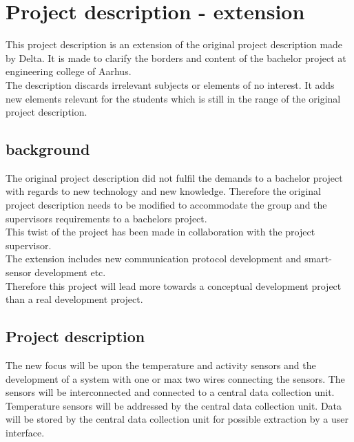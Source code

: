 \chapter{Project description - extension}
This project description is an extension of the original project description made by Delta. It is made to clarify the borders and content of the bachelor project at engineering college of Aarhus.\\
The description discards irrelevant subjects or elements of no interest. It adds new elements relevant for the students which is still in the range of the original project description.


\section{background}
The original project description did not fulfil the demands to a bachelor project with regards to new technology and new knowledge. Therefore the original project description needs to be modified to accommodate the group and the supervisors requirements to a bachelors project. \\
This twist of the project has been made in collaboration with the project supervisor.\\
The extension includes new communication protocol development and smart-sensor development etc.\\
Therefore this project will lead more towards a conceptual development project than a real development project.\\


\section{Project description}
The new focus will be upon the temperature and activity sensors and the development of a system with one or max two wires connecting the sensors. The sensors will be interconnected and connected to a central data collection unit. Temperature sensors will be addressed by the central data collection unit. Data will be stored by the central data collection unit for possible extraction by a user interface. 
